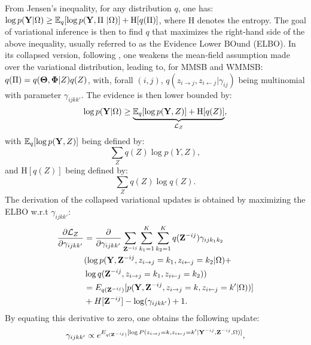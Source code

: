 From Jensen's inequality, for any distribution $q$, one has: $\log p({\mathbf{Y}} | \Omega) \ge \mathbb{E}_{q}[\log p({\mathbf{Y}}, \Pi\ | \Omega)] + \textrm{H}[q(\Pi)]$,
where $\textrm{H}$ denotes the entropy. The goal of variational inference is then to find $q$ that maximizes the right-hand side of the above inequality, usually referred to as the Evidence Lower BOund (ELBO). In its collapsed version, following \cite{teh2007collapsed}, one weakens the mean-field assumption made over the variational distribution, leading to, for MMSB and WMMSB: $q(\Pi) = q({\boldsymbol{\Theta}}, {\boldsymbol{\Phi}} | Z) q(Z)$,
with, forall $(i,j)$, $q(z_{i \rightarrow j}, z_{i \leftarrow j}|\gamma_{ij})$ being multinomial with parameter $\gamma_{ijkk'}$. The evidence is then lower bounded by:
%
\begin{equation*}
\log p({\mathbf{Y}}|\Omega) \geq \underbrace{\mathbb{E}_{q}[\log p({\mathbf{Y}}, Z)] + \textrm{H}[q(Z)]}_{\mathcal{L}_Z},
\end{equation*}
%
with $\mathbb{E}_{q}[\log p({\mathbf{Y}}, Z)]$ being defined by:
\[
\sum_Z q(Z) \log p(Y, Z),
\]
%
and $\textrm{H}[q(Z)]$ being defined by:
%
\[
\sum_Z q(Z) \log q(Z).
\]
%
The derivation of the collapsed variational updates is obtained by maximizing the ELBO w.r.t $\gamma_{ijkk'}$:
%
\begin{align*}
\frac{\partial \mathcal{L}_Z}{\partial \gamma_{ijkk'}} &= \frac{\partial }{\partial \gamma_{ijkk'}} \sum_{{\mathbf{Z}}^{-ij}}\sum_{k_1=1}^K\sum_{k_2=1}^K  q({\mathbf{Z}}^{-ij}) \gamma_{ijk_1 k_2} \\
& (\log p({\mathbf{Y}}, {\mathbf{Z}}^{-ij}, z_{i\rightarrow j}=k_1, z_{i\leftarrow j}=k_2|\Omega)+ \\
& \log q({\mathbf{Z}}^{-ij}, z_{i\rightarrow j}=k_1, z_{i\leftarrow j}=k_2) )   \\
& = E_{q({\mathbf{Z}}^{-ij})}[ p({\mathbf{Y}}, {\mathbf{Z}}^{-ij}, z_{i\rightarrow j}=k, z_{i\leftarrow j}=k'|\Omega))] \\
& + H[{\mathbf{Z}}^{-ij}] -\log(\gamma_{ijkk'}) +1.
\end{align*}
%
By equating this derivative to zero, one obtains the following update:
\begin{equation} \label{eq1}
\gamma_{ijkk'} \propto e^{E_{q({\mathbf{Z}}^{-ij})} [\log P(z_{i\rightarrow j}=k, z_{i\leftarrow j}=k' | {\mathbf{Y}}^{-ij}, {\mathbf{Z}}^{-ij}, \Omega)]},
\end{equation}
